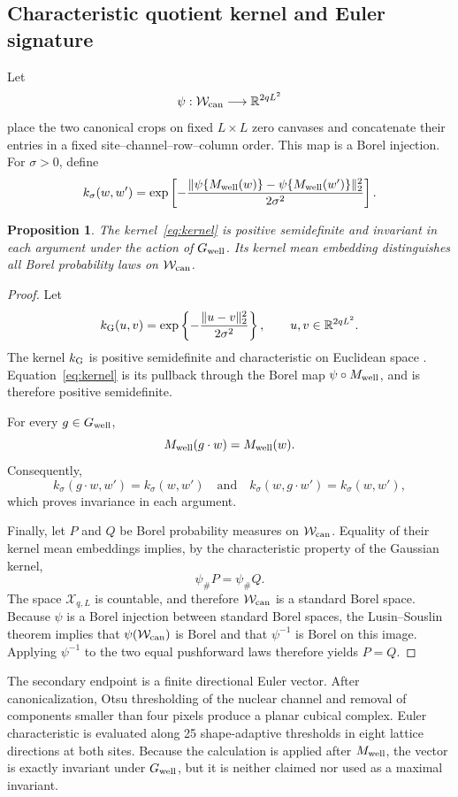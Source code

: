 \documentclass[11pt]{article}
\theoremstyle{plain}
\newtheorem{proposition}[theorem]{Proposition}
\theoremstyle{definition}
\numberwithin{equation}{section}
\newcommand{\1}{\mathbf 1}
\newcommand{\calX}{\mathcal X}
\newcommand{\calW}{\mathcal W}
\begin{document}
\subsection{Characteristic quotient kernel and Euler signature}
Let
\[
\psi:\calW_{\rm can}\longrightarrow\mathbb R^{2qL^2}
\]
place the two canonical crops on fixed $L\times L$ zero canvases and
concatenate their entries in a fixed site--channel--row--column order.
This map is a Borel injection.
 For $\sigma>0$, define
\begin{equation}\label{eq:kernel}
	k_\sigma(w,w')
	=
	\exp\left[
	-\frac{
		\|\psi\{M_{\rm well}(w)\}
		-\psi\{M_{\rm well}(w')\}\|_2^2
	}{2\sigma^2}
	\right].
\end{equation}

\begin{proposition}\label{prop:kernel}
	The kernel~\eqref{eq:kernel} is positive semidefinite and invariant
	in each argument under the action of $G_{\rm well}$. Its kernel mean
	embedding distinguishes all Borel probability laws on
	$\calW_{\rm can}$.
\end{proposition}

\begin{proof}
	Let
	\[
	k_{\rm G}(u,v)
	=
	\exp\left\{-\frac{\|u-v\|_2^2}{2\sigma^2}\right\},
	\qquad
	u,v\in\mathbb R^{2qL^2}.
	\]
	The kernel $k_{\rm G}$ is positive semidefinite and characteristic on
	Euclidean space \citep{Sriperumbudur2010}. Equation~\eqref{eq:kernel}
	is its pullback through the Borel map
	$\psi\circ M_{\rm well}$, and is therefore positive semidefinite.
	
	For every $g\in G_{\rm well}$,
	\[
	M_{\rm well}(g\cdot w)=M_{\rm well}(w).
	\]
	Consequently,
	\[
	k_\sigma(g\cdot w,w')=k_\sigma(w,w')
	\quad\text{and}\quad
	k_\sigma(w,g\cdot w')=k_\sigma(w,w'),
	\]
	which proves invariance in each argument.
	
	Finally, let $P$ and $Q$ be Borel probability measures on
	$\calW_{\rm can}$. Equality of their kernel mean embeddings implies,
	by the characteristic property of the Gaussian kernel,
	\[
	\psi_{\#}P=\psi_{\#}Q.
	\]
	The space $\calX_{q,L}$ is countable, and therefore
	$\calW_{\rm can}$ is a standard Borel space. Because $\psi$ is a Borel
	injection between standard Borel spaces,
	the Lusin--Souslin theorem implies that $\psi(\calW_{\rm can})$ is
	Borel and that $\psi^{-1}$ is Borel on this image. Applying
	$\psi^{-1}$ to the two equal pushforward laws therefore yields
	$P=Q$.
\end{proof}

The secondary endpoint is a finite directional Euler vector. After canonicalization, Otsu thresholding \citep{Otsu1979} of the nuclear channel and removal of components smaller than four pixels produce a planar cubical complex. Euler characteristic is evaluated along 25 shape-adaptive thresholds in eight lattice directions at both sites. Because the calculation is applied after $M_{\rm well}$, the vector is exactly invariant under $G_{\rm well}$, but it is neither claimed nor used as a maximal invariant.
\end{document}
